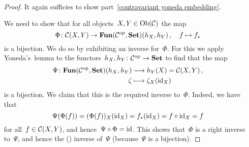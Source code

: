 \begin{proof}
  It again sufficies to show part~\ref*{contravariant yoneda embedding}.
  
  We need to show that for all objects~$X, Y \in \operatorname{Ob}(\mathcal{C})$ the map
  \[
            \Phi
    \colon  \mathcal{C}(X,Y)
    \to     \mathbf{Fun}(\mathcal{C}^{\mathrm{op}}, \mathbf{Set})(h_X, h_Y) \,,
    \quad   f
    \mapsto f_*
  \]
  is a bijection.
  We do so by exhibiting an inverse for~$\Phi$.
  For this we apply Yoneda’s~lemma to the functors~$h_X, h_Y \colon \mathcal{C}^{\mathrm{op}} \to \mathbf{Set}$ to find that the map
  \begin{align*}
              \Psi
     \colon   \mathbf{Fun}(\mathcal{C}^{\mathrm{op}}, \mathbf{Set})(h_X, h_Y)
    &\longrightarrow  h_Y(X)
     =        \mathcal{C}(X,Y)  \,,
    \\
                  \zeta
    &\longmapsto  \zeta_X(\operatorname{id}_X)
  \end{align*}
  is a bijection.
  We claim that this is the required inverse to~$\Phi$.
  Indeed, we have that
  \[
      \Psi(\Phi(f))
    = (\Phi(f))_X(\operatorname{id}_X)
    = f_*(\operatorname{id}_X)
    = f \circ {\operatorname{id}_X}
    = f
  \]
  for all~$f \in \mathcal{C}(X,Y)$, and hence~$\Psi \circ \Phi = \operatorname{id}$.
  This shows that~$\Phi$ is a right inverse to~$\Psi$, and hence the ({\twosided}) inverse of~$\Psi$ (because~$\Psi$ is a bijection).
\end{proof}


